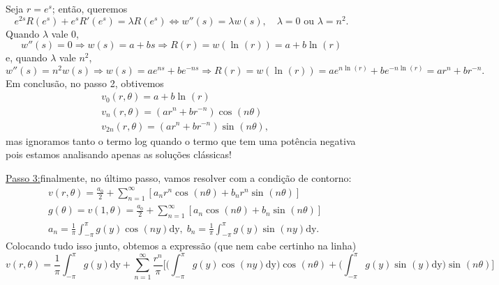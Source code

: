 \documentclass[../pde_notes.tex]{subfiles}
\begin{document}
Seja \(r = e^{s}\); então, queremos
\[
	e^{2s}R(e^{s})+e^{s}R'(e^{s}) = \lambda R(e^{s}) \Longleftrightarrow w''(s) = \lambda w(s),\quad \lambda  = 0 \text{ ou }\lambda =n^{2}.
\]
Quando \(\lambda \) vale 0,
\[
	w''(s) = 0 \Rightarrow w(s) = a + bs \Rightarrow R(r) = w(\ln^{}{(r)}) = a+b\ln^{}{(r)}
\]
e, quando \(\lambda \) vale \(n^{2}\),
\[
	w''(s) = n^{2}w(s) \Rightarrow w(s) = ae^{ns}+be^{-ns} \Rightarrow R(r)=w(\ln^{}{(r)})=ae^{n\ln^{}{(r)}}+be^{-n\ln^{}{(r)}}=ar^{n}+br^{-n}.
\]
Em conclusão, no passo 2, obtivemos
\begin{align*}
	 & v_{0}(r, \theta ) = a + b\ln^{}{(r)}                      \\
	 & v_{n}(r, \theta ) = (ar^{n}+br^{-n})\cos^{}{(n\theta )}   \\
	 & v_{2n}(r, \theta ) = (ar^{n}+br^{-n})\sin^{}{(n\theta )},
\end{align*}
mas ignoramos tanto o termo log quando o termo que tem uma potência negativa pois estamos analisando apenas as soluções clássicas!

{\color{Thistle2}\underline{Passo 3:}}finalmente, no último passo, vamos resolver com a condição de contorno:
\begin{align*}
	 & v(r, \theta ) = \frac{a_{0}}{2} + \sum\limits_{n=1}^{\infty}[a_{n}r^{n}\cos^{}{(n\theta )}+b_{n}r^{n}\sin^{}{(n\theta )}]                       \\
	 & g(\theta ) = v(1, \theta ) = \frac{a_{0}}{2} + \sum\limits_{n=1}^{\infty}[a_{n}\cos^{}{(n\theta )}+b_{n}\sin^{}{(n\theta )}]                    \\
	 & a_{n}=\frac{1}{\pi }\int_{-\pi }^{\pi }g(y)\cos^{}{(ny)} \mathrm{dy},\; b_{n} = \frac{1}{\pi }\int_{-\pi }^{\pi }g(y)\sin^{}{(ny)} \mathrm{dy}.
\end{align*}
Colocando tudo isso junto, obtemos a expressão (que nem cabe certinho na linha)
\[
	v(r,\theta )=\frac{1}{\pi }\int_{-\pi }^{\pi }g(y) \mathrm{dy} + \sum\limits_{n=1}^{\infty}\frac{r^{n}}{\pi }\biggl[\biggl(\int_{-\pi }^{\pi }g(y)\cos^{}{(ny)} \mathrm{dy}\biggr)\cos^{}{(n\theta )}+\biggl(\int_{-\pi }^{\pi }g(y)\sin^{}{(y)} \mathrm{dy}\biggr)\sin^{}{(n\theta )}\biggr]
\]
\end{document}
